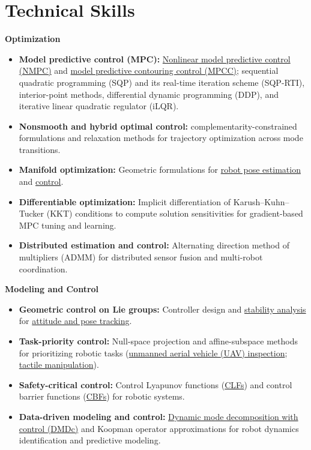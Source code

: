 \documentclass[letterpaper,11pt]{article}
\begin{document}
\section{Technical Skills}
{\small\textbf{Optimization}\par}
\begin{itemize}[leftmargin=0.22in, itemsep=2pt, parsep=0pt, topsep=4pt]
\small
\item \textbf{Model predictive control (MPC):} \href{https://arxiv.org/abs/2510.11525}{Nonlinear model predictive control (NMPC)} and \href{https://arxiv.org/abs/2609.36482}{model predictive contouring control (MPCC)}; sequential quadratic programming (SQP) and its real-time iteration scheme (SQP-RTI), interior-point methods, differential dynamic programming (DDP), and iterative linear quadratic regulator (iLQR).
\item \textbf{Nonsmooth and hybrid optimal control:} complementarity-constrained formulations and relaxation methods for trajectory optimization across mode transitions.
\item \textbf{Manifold optimization:} Geometric formulations for \href{https://arxiv.org/abs/2410.13541}{robot pose estimation} and \href{https://arxiv.org/abs/2510.11525}{control}.
\item \textbf{Differentiable optimization:} Implicit differentiation of Karush--Kuhn--Tucker (KKT) conditions to compute solution sensitivities for gradient-based MPC tuning and learning.
\item \textbf{Distributed estimation and control:} Alternating direction method of multipliers (ADMM) for distributed sensor fusion and multi-robot coordination.
\end{itemize}
{\small\textbf{Modeling and Control}\par}
\begin{itemize}[leftmargin=0.22in, itemsep=2pt, parsep=0pt, topsep=4pt]
\small
\item \textbf{Geometric control on Lie groups:} Controller design and \href{https://arxiv.org/abs/2504.08841}{stability analysis} for \href{https://arxiv.org/abs/2510.11525}{attitude and pose tracking}.
\item \textbf{Task-priority control:} Null-space projection and affine-subspace methods for prioritizing robotic tasks (\href{https://arxiv.org/abs/2311.08019}{unmanned aerial vehicle (UAV) inspection}; \href{https://arxiv.org/abs/2605.20392}{tactile manipulation}).
\item \textbf{Safety-critical control:} Control Lyapunov functions (\href{https://arxiv.org/abs/2504.08841}{CLFs}) and control barrier functions (\href{https://arxiv.org/abs/2504.08841}{CBFs}) for robotic systems.
\item \textbf{Data-driven modeling and control:} \href{https://doi.org/10.1016/j.ifacol.2023.12.088}{Dynamic mode decomposition with control (DMDc)} and Koopman operator approximations for robot dynamics identification and predictive modeling.
\end{itemize}
\newpage
\end{document}
